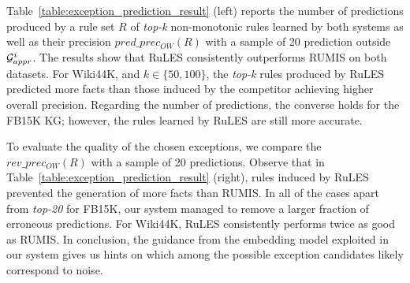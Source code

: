 




Table~\ref{table:exception_prediction_result} (left) reports the number of predictions produced by a rule set $R$ of 
\textit{top-k} non-monotonic rules learned 
by both systems as well as 
their precision $pred\_prec_{OW}(R)$ with a sample of 20 prediction outside $\mathcal{G}^i_{appr}$. The results show that RuLES consistently outperforms RUMIS 
on both datasets. For Wiki44K, and $k\in\{50,100\}$, the \textit{top-k} rules produced by RuLES predicted more facts than those induced by the competitor 
achieving higher overall precision. 
Regarding the number of predictions, the converse holds for the FB15K KG; however, the rules learned by RuLES are still more accurate.

To evaluate the quality of the chosen exceptions, we compare the $rev\_prec_{OW}(R)$ with a sample of 20 predictions. Observe that in Table~\ref{table:exception_prediction_result} (right), rules induced by RuLES prevented the generation of more facts than RUMIS. 
In all of the cases apart from \textit{top-20} for FB15K, our system 
managed to remove a larger fraction of erroneous predictions. 
For Wiki44K, RuLES consistently performs twice as good as RUMIS. 
In conclusion, the guidance from the embedding model 
exploited in our system 
gives us hints on which among the possible exception candidates likely correspond to noise.   












